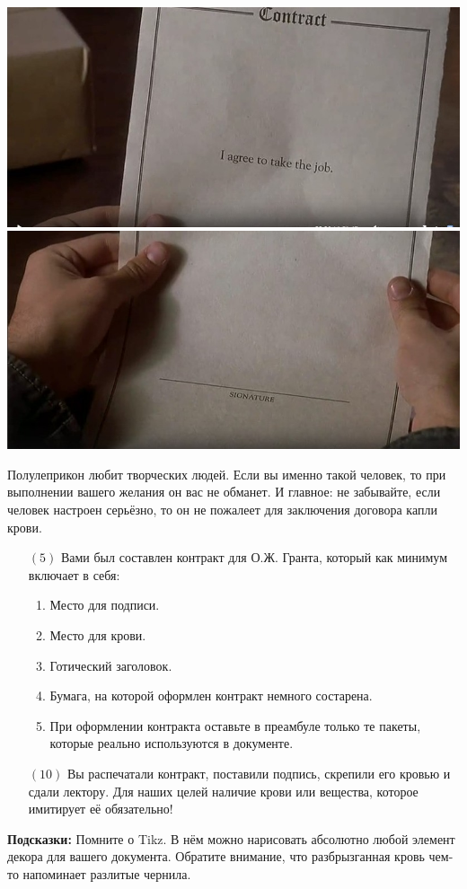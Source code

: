 \documentclass[12pt, a4paper, oneside]{article}
\begin{document}
\begin{center}
	\includegraphics[scale=0.4]{Hg91uSv1cik.jpg}
	\includegraphics[scale=0.4]{t_XxgIqEmBE.jpg}
\end{center} 

Полулеприкон любит творческих людей. Если вы именно такой человек, то при выполнении вашего желания он вас не обманет. И главное: не забывайте, если человек настроен серьёзно, то он не пожалеет для заключения договора капли крови.

\begin{itemize}
\item[$(5)$]   Вами был составлен контракт для О.Ж. Гранта, который как минимум включает в себя:

\begin{enumerate}
\item  Место для подписи.
\item  Место для крови.
\item  Готический заголовок.
\item  Бумага, на которой оформлен контракт немного состарена.
\item  При оформлении контракта оставьте в преамбуле только те пакеты, которые реально используются в документе.
\end{enumerate}

\item[$(10)$] Вы распечатали контракт, поставили подпись, скрепили его кровью и сдали лектору. Для наших целей наличие крови или вещества, которое имитирует её обязательно!
\end{itemize}

\textbf{Подсказки:}  Помните о Tikz. В нём можно нарисовать абсолютно любой элемент декора для вашего документа. Обратите внимание, что разбрызганная кровь чем-то напоминает разлитые чернила.
\end{document}
